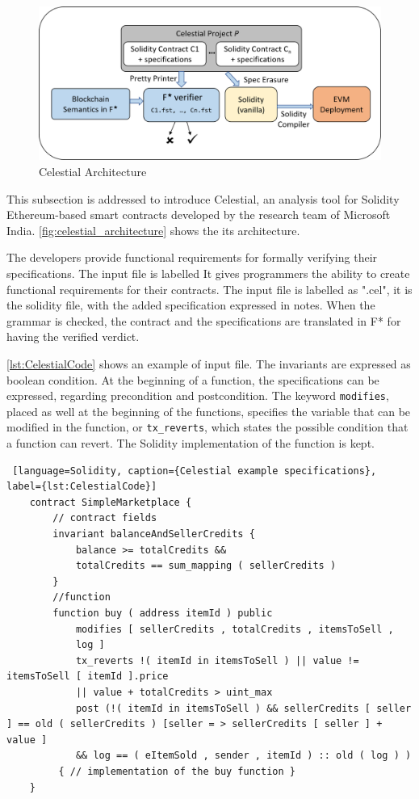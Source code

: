 \label{sec:Specification:Celestial}
\begin{figure}
    \centering
    \includegraphics[width=13cm]{logos/CelestialArchitecture.png}
    \caption{Celestial Architecture}
    \label{fig:celestial_architecture}
\end{figure}

This subsection is addressed to introduce Celestial, 
an analysis tool for Solidity Ethereum-based smart contracts developed by the research team of Microsoft India.
\autoref{fig:celestial_architecture} shows the its architecture. 

The developers provide functional requirements for formally verifying their specifications. The input file is labelled 
It gives programmers the ability to create functional requirements for their contracts. 
The input file is labelled as ".cel", it is the solidity file, with the added specification expressed in notes. 
When the grammar is checked, the contract and the specifications are translated in F* for having the verified verdict. 

\autoref*{lst:CelestialCode} shows an example of input file. The invariants are expressed as boolean condition. 
At the beginning of a function, the specifications can be expressed, regarding precondition and postcondition. 
The keyword \texttt{modifies}, placed as well at the beginning of the functions, specifies the variable that can be modified in the function, or \texttt{tx\_reverts}, 
which states the possible condition that a function can revert. 
The Solidity implementation of the function is kept.
\begin{lstlisting} [language=Solidity, caption={Celestial example specifications}, label={lst:CelestialCode}]
    contract SimpleMarketplace {
        // contract fields
        invariant balanceAndSellerCredits {
            balance >= totalCredits &&
            totalCredits == sum_mapping ( sellerCredits )
        }
        //function 
        function buy ( address itemId ) public
            modifies [ sellerCredits , totalCredits , itemsToSell ,
            log ]
            tx_reverts !( itemId in itemsToSell ) || value != itemsToSell [ itemId ].price
            || value + totalCredits > uint_max
            post (!( itemId in itemsToSell ) && sellerCredits [ seller ] == old ( sellerCredits ) [seller = > sellerCredits [ seller ] + value ]
            && log == ( eItemSold , sender , itemId ) :: old ( log ) )
         { // implementation of the buy function }
    }
\end{lstlisting}

